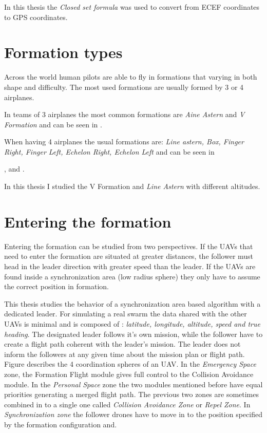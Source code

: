 In this thesis the \textit{Closed set formula} was used to convert from ECEF
coordinates to GPS coordinates.

\section{Formation types}
\label{sec::formation-types}
Across the world human pilots are able to fly in formations that varying in both
shape and difficulty. The most used formations are usually formed by 3 
or 4 airplanes. 

In teams of 3 airplanes the most common formations are \textit{Aine Astern} and
\textit{V Formation} and can be seen in .
% 
\newpage

When having 4 airplanes the usual formations are: \textit{Line astern,  Box, 
Finger Right, Finger Left,  Echelon Right, Echelon Left} and can be seen in

,   and
.
\newpage

In this thesis I studied the {V Formation} and \textit{Line Astern} with different
altitudes.

\section{Entering the formation}
\label{sec:formation-entering}
Entering the formation can be studied from two perspectives. If the UAVs
that need to enter the formation are situated at greater distances, the follower
must head in the leader direction with greater speed than the leader. If the 
UAVs are found inside a synchronization area (low radius sphere) they only have to
assume the correct position in formation. 

This thesis studies the behavior of a synchronization area based algorithm with
a dedicated leader. For simulating a real swarm the data shared with the other
UAVs is minimal and is composed of : \textit{latitude, longitude, altitude, speed 
and true heading}. The designated leader follows it's own mission, while
the follower have to create a flight path coherent with the leader's mission.
The leader does not inform the followers at any given time about the mission 
plan or flight path. Figure  describes
the 4 coordination spheres of an UAV. In the \textit{Emergency Space} zone, 
the Formation Flight module gives full control to the Collision Avoidance module.
In the \textit{Personal Space} zone the two modules mentioned before have equal
priorities generating a merged flight path. The previous two zones are sometimes
combined in to a single one called \textit{Collision Avoidance Zone} or 
\textit{Repel Zone}. In \textit{Synchronization zone} the follower drones have
to move in to the position specified by the formation configuration and.


